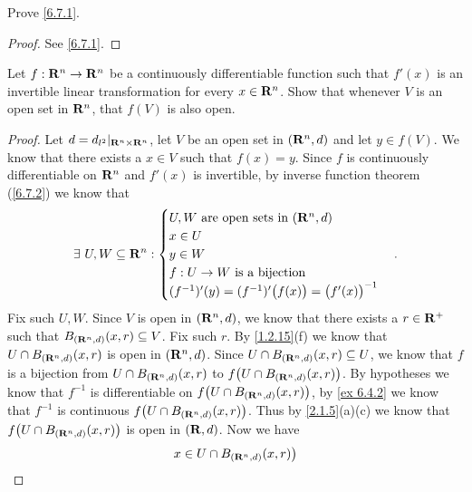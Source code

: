 \begin{exercise}\label{ex 6.7.2}
  Prove \cref{6.7.1}.
\end{exercise}

\begin{proof}
  See \cref{6.7.1}.
\end{proof}

\begin{exercise}\label{ex 6.7.3}
  Let \(f : \mathbf{R}^n \to \mathbf{R}^n\) be a continuously differentiable function such that \(f'(x)\) is an invertible linear transformation for every \(x \in \mathbf{R}^n\).
  Show that whenever \(V\) is an open set in \(\mathbf{R}^n\), that \(f(V)\) is also open.
\end{exercise}

\begin{proof}
  Let \(d = d_{l^2}|_{\mathbf{R}^n \times \mathbf{R}^n}\), let \(V\) be an open set in \((\mathbf{R}^n, d)\) and let \(y \in f(V)\).
  We know that there exists a \(x \in V\) such that \(f(x) = y\).
  Since \(f\) is continuously differentiable on \(\mathbf{R}^n\) and \(f'(x)\) is invertible, by inverse function theorem (\cref{6.7.2}) we know that
  \[
    \exists\ U, W \subseteq \mathbf{R}^n : \begin{cases}
      U, W \text{ are open sets in } (\mathbf{R}^n, d) \\
      x \in U                                  \\
      y \in W                                  \\
      f : U \to W \text{ is a bijection}       \\
      (f^{-1})'(y) = (f^{-1})'\big(f(x)\big) = \big(f'(x)\big)^{-1}
    \end{cases}.
  \]
  Fix such \(U, W\).
  Since \(V\) is open in \((\mathbf{R}^n, d)\), we know that there exists a \(r \in \mathbf{R}^+\) such that \(B_{(\mathbf{R}^n, d)}(x, r) \subseteq V\).
  Fix such \(r\).
  By \cref{1.2.15}(f) we know that \(U \cap B_{(\mathbf{R}^n, d)}(x, r)\) is open in \((\mathbf{R}^n, d)\).
  Since \(U \cap B_{(\mathbf{R}^n, d)}(x, r) \subseteq U\), we know that \(f\) is a bijection from \(U \cap B_{(\mathbf{R}^n, d)}(x, r)\) to \(f\big(U \cap B_{(\mathbf{R}^n, d)}(x, r)\big)\).
  By hypotheses we know that \(f^{-1}\) is differentiable on \(f\big(U \cap B_{(\mathbf{R}^n, d)}(x, r)\big)\), by \cref{ex 6.4.2} we know that \(f^{-1}\) is continuous \(f\big(U \cap B_{(\mathbf{R}^n, d)}(x, r)\big)\).
  Thus by \cref{2.1.5}(a)(c) we know that \(f\big(U \cap B_{(\mathbf{R}^n, d)}(x, r)\big)\) is open in \((\mathbf{R}, d)\).
  Now we have
  \begin{align*}
             & x \in U \cap B_{(\R^n, d)}(x, r)\big)                                                                                                  \\

\end{align*}
\end{proof}
